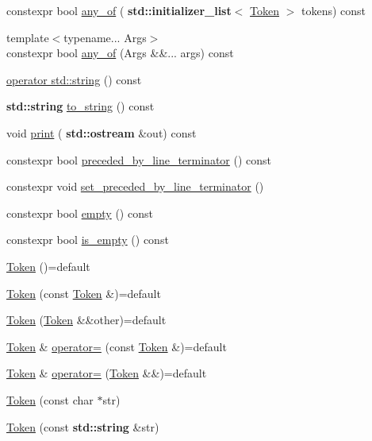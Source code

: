 \begin{DoxyCompactItemize}
constexpr bool \hyperlink{class_token_a0aeba20251cf6afb5f9deee77bc10e2c}{any\+\_\+of} (\textbf{ std\+::initializer\+\_\+list}$<$ \hyperlink{class_token}{Token} $>$ tokens) const
\item 
{\footnotesize template$<$typename... Args$>$ }\\constexpr bool \hyperlink{class_token_a154f07c45f704f530fcf5b0ef2eaeeef}{any\+\_\+of} (Args \&\&... args) const
\item 
\hyperlink{class_token_a37a03ca940a3abaec1491c9306bafa2a}{operator std\+::string} () const
\item 
\textbf{ std\+::string} \hyperlink{class_token_a602aa1415de3415044205333495e72f5}{to\+\_\+string} () const
\item 
void \hyperlink{class_token_ae3e466fdaf072ec89d2c4bf78b91d5e9}{print} (\textbf{ std\+::ostream} \&out) const
\item 
constexpr bool \hyperlink{class_token_aec736aba84de102878db8605f8574e38}{preceded\+\_\+by\+\_\+line\+\_\+terminator} () const
\item 
constexpr void \hyperlink{class_token_a1a3247e7cb73b8f7a5f03517163275e7}{set\+\_\+preceded\+\_\+by\+\_\+line\+\_\+terminator} ()
\item 
constexpr bool \hyperlink{class_token_aaed20163d2aee9be88f80f28ba7f9200}{empty} () const
\item 
constexpr bool \hyperlink{class_token_a9c8d38440d6d13ad1c8c943045e0a508}{is\+\_\+empty} () const
\item 
\hyperlink{class_token_a761bf97d165988a4250dc26500d36f89}{Token} ()=default
\item 
\hyperlink{class_token_a350ebd7ea16caa846b858ecdb1c273c6}{Token} (const \hyperlink{class_token}{Token} \&)=default
\item 
\hyperlink{class_token_ad54b3c0ede5688f86caea4a936e0a4c6}{Token} (\hyperlink{class_token}{Token} \&\&other)=default
\item 
\hyperlink{class_token}{Token} \& \hyperlink{class_token_a302f8febd87a9cca349ba76dfd782548}{operator=} (const \hyperlink{class_token}{Token} \&)=default
\item 
\hyperlink{class_token}{Token} \& \hyperlink{class_token_a4f45441b8d2dfe881c448377d4ca2cd4}{operator=} (\hyperlink{class_token}{Token} \&\&)=default
\item 
\hyperlink{class_token_a14690319b7df185a3899d4b2aedb59dc}{Token} (const char $\ast$str)
\item 
\hyperlink{class_token_a213c87418a6ff6375ab2298ee93acf43}{Token} (const \textbf{ std\+::string} \&str)

\end{DoxyCompactItemize}
